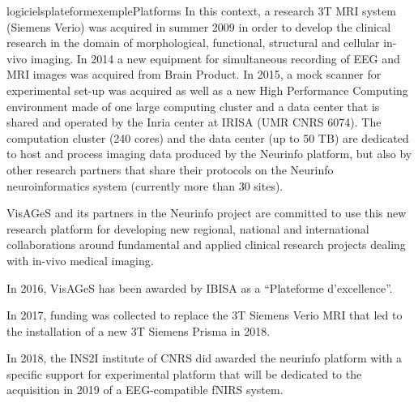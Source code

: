 \documentclass{ra2018}
\begin{document}
\begin{module}{logiciels}{plateformexemple}{Platforms}
In this context, a research 3T MRI system (Siemens Verio) was acquired in summer 2009 in order to develop the clinical research in the domain of morphological, functional, structural and cellular in-vivo imaging. In 2014 a new equipment for simultaneous recording of EEG and MRI images was acquired from Brain Product. In 2015, a mock scanner for experimental set-up was acquired as well as a new High Performance Computing environment made of one large computing cluster and a data center that is shared and operated by the Inria center at IRISA (UMR CNRS 6074). The computation cluster (240 cores) and the data center (up to 50 TB) are dedicated to host and process imaging data produced by the Neurinfo platform, but also by other research partners that share their protocols on the Neurinfo neuroinformatics system (currently more than 30 sites).

VisAGeS and its partners in the Neurinfo project are committed to use this new research platform for developing new regional, national and international collaborations around fundamental and applied clinical research projects dealing with in-vivo medical imaging.

In 2016, VisAGeS has been awarded by IBISA as a “Plateforme d'excellence”.

In 2017, funding was collected to replace the 3T Siemens Verio MRI that led to the installation of a new 3T Siemens Prisma in 2018.

In 2018, the INS2I institute of CNRS did awarded the neurinfo platform with a specific support for experimental platform that will be dedicated to the acquisition in 2019 of a EEG-compatible fNIRS system.

 \end{module}



\end{document}
